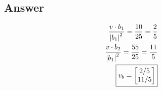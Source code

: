 \documentclass[12pt]{article}
\begin{document}
    \subsection*{Answer}
    \begin{eqnarray*}
        \frac{v \cdot b_1}{\abs{b_1}^2} = \frac{10}{25} = \frac{2}{5} \\
        \frac{v \cdot b_2}{\abs{b_1}^2} = \frac{55}{25} = \frac{11}{5} \\
        \boxed{v_b = 
        \begin{bmatrix}
            2/5 \\ 11/5
        \end{bmatrix}}
    \end{eqnarray*}
\end{document}
